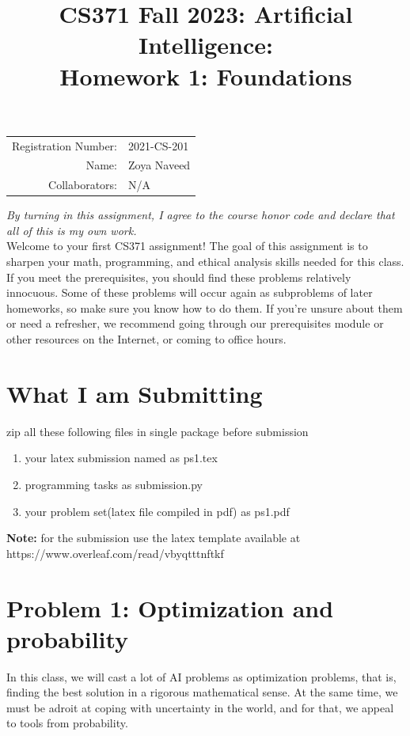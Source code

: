 \documentclass{article}
\title{\textbf{CS371 Fall 2023: Artificial Intelligence: \\Homework 1: Foundations}}
\date{}
\theoremstyle{case}
\theoremstyle{definition}
\begin{document}
\maketitle

\begin{center}
\begin{tabular}{rl}
Registration Number: & 2021-CS-201 \\
Name: & Zoya Naveed \\
Collaborators: & N/A
\end{tabular}
\end{center}

\textit{By turning in this assignment, I agree to the course honor code and declare that all of this is my own work.} \\



Welcome to your first CS371 assignment! The goal of this assignment is to sharpen your math, programming, and ethical analysis skills needed for this class. If you meet the prerequisites, you should find these problems relatively innocuous. Some of these problems will occur again as subproblems of later homeworks, so make sure you know how to do them. If you're unsure about them or need a refresher, we recommend going through our prerequisites module or other resources on the Internet, or coming to office hours.\\

\section*{What I am Submitting}
zip all these following files in single package before submission
\begin{enumerate}
    \item your latex submission named as ps1.tex
    \item programming tasks as submission.py
    \item your problem set(latex file compiled in pdf) as ps1.pdf
\end{enumerate}


\textbf{Note:} for the submission use the latex template available at https://www.overleaf.com/read/vbyqtttnftkf
\section*{Problem 1: Optimization and probability}

In this class, we will cast a lot of AI problems as optimization problems, that is, finding the best solution in a rigorous mathematical sense.
At the same time, we must be adroit at coping with uncertainty in the world, and for that, we appeal to tools from probability.
\end{document}
